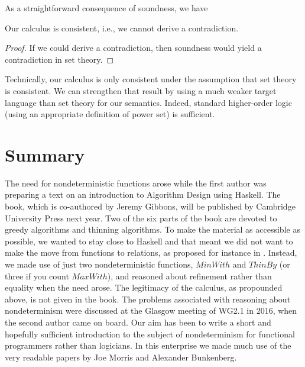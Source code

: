 \documentclass{llncs}
\newcommand{\Conid}[1]{\mathit{#1}}
\begin{document}
As a straightforward consequence of soundness, we have
\begin{theorem}[Consistency]
Our calculus is consistent, i.e., we cannot derive a contradiction.
\end{theorem}
\begin{proof}
If we could derive a contradiction, then soundness would yield a contradiction in set theory.
\end{proof}
Technically, our calculus is only consistent under the assumption that set theory is consistent.
We can strengthen that result by using a much weaker target language than set theory for our semantics.
Indeed, standard higher-order logic (using an appropriate definition of power set) is sufficient.

\section{Summary}

The need for nondeterministic functions arose while the first author was preparing a
text on an introduction to Algorithm Design using Haskell. The book, which is co-authored by
Jeremy Gibbons, will be published by Cambridge University Press next year. Two of the six
parts of the book are devoted to greedy algorithms and thinning algorithms. To make the
material as accessible as possible, we wanted to stay close to Haskell and that meant
we did not want to make the move from functions to relations, as proposed for instance in \cite{bird&demoor}.
Instead, we made use of just two nondeterministic functions, \ensuremath{\Conid{MinWith}} and \ensuremath{\Conid{ThinBy}} (or
three if you count \ensuremath{\Conid{MaxWith}}), and reasoned about refinement rather than equality when the
need arose. The legitimacy of the calculus, as propounded above, is not given in the book. 
The problems associated with reasoning about nondeterminism were discussed at the Glasgow 
meeting of WG2.1 in 2016, when the second author came on board. Our aim has been to write a 
short and hopefully sufficient introduction to the subject of nondeterminism for functional programmers rather than logicians. In this enterprise we made much use of the very readable 
papers by Joe Morris and Alexander Bunkenberg. 
\end{document}
